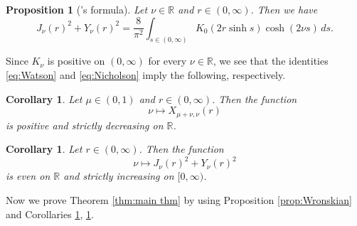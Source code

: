 \documentclass[reqno,letterpaper]{amsart}
\numberwithin{equation}{section}
\theoremstyle{plain}
\newtheorem{corollary}[theorem]{Corollary}
\newtheorem{proposition}[theorem]{Proposition}
\newcommand{\R}{\mathbb{R}}
\newcommand{\BesselJ}[1]{J_{#1}}
\newcommand{\BesselK}[1]{K_{#1}}
\newcommand{\BesselY}[1]{Y_{#1}}
\newcommand{\crossmunu}[2]{X_{#1, #2}}
\newcommand{\intervaloo}[2]{(#1, #2)}
\newcommand{\intervalco}[2]{[#1, #2)}
\begin{document}
	\begin{proposition}[\citeauthor{Nic1910}'s formula]
		Let $\nu \in \R$ and $r \in \intervaloo{0}{\infty}$.
		Then we have
		\begin{equation} \label{eq:Nicholson}
			\BesselJ{\nu}(r)^2 + \BesselY{\nu}(r)^2 = \frac{8}{\pi^2} \int_{s \in \intervaloo{0}{\infty}} \BesselK{0}(2 r \sinh{s}) \cosh( 2 \nu s ) \, ds .
		\end{equation}
	\end{proposition}
	Since $\BesselK{\nu}$ is positive on $\intervaloo{0}{\infty}$ for every $\nu \in \R$, 
	we see that the identities \eqref{eq:Watson} and \eqref{eq:Nicholson} imply the following, respectively.
	\begin{corollary} \label{cor:Watson}
		Let $\mu \in \intervaloo{0}{1}$ and $r \in \intervaloo{0}{\infty}$. Then the function
		\begin{equation}
			\nu \longmapsto \crossmunu{\mu+\nu}{\nu}(r)
		\end{equation}
		is positive and strictly decreasing on $\R$.
	\end{corollary}
	\begin{corollary} \label{cor:Nicholson}
		Let $r \in \intervaloo{0}{\infty}$.
		Then the function
		\begin{equation}
			\nu \longmapsto \BesselJ{\nu}(r)^2 + \BesselY{\nu}(r)^2 
		\end{equation}
		is even on $\R$ and strictly increasing on $\intervalco{0}{\infty}$.
	\end{corollary}
	Now we prove Theorem \ref{thm:main thm} by using Proposition \ref{prop:Wronskian} and Corollaries \ref{cor:Watson}, \ref{cor:Nicholson}.  
\end{document}
